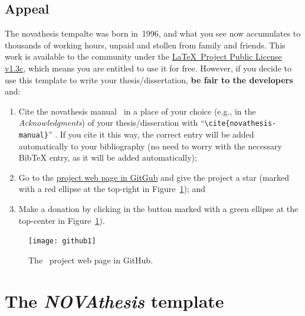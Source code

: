 \subsection{Appeal}
\label{sub:appeal}

The \gls{novathesis} tempalte was born in~1996, and what you see now accumulates to thousands of working hours, unpaid and stollen from family and friends.  This work is available to the community under the \href{LaTeX project public license}{\LaTeX\ Project Public License v1.3c}, which means you are entitled to use it for free.  However, if you decide to use this template to write your thesis/dissertation, \textbf{be fair to the developers} and:
\begin{enumerate}
  \item Cite the \gls{novathesis} manual~\cite{novathesis-manual} in a place of your choice (e.g., in the \emph{Acknowledgments}) of your thesis/disseration with “\verb!\cite{novathesis-manual}!” .  If you cite it this way, the correct entry will be added automatically to your bibliography (no need to worry with the necessary BibTeX entry, as it will be added automatically);
  \item Go to the
\href{https://github.com/joaomlourenco/novathesis}{project web page in GitGub} and give the project a star (marked with a red ellipse at the top-right in Figure~\ref{fig:github}); and
  \item Make a donation by clicking in the button marked with a green ellipse at the top-center in Figure~\ref{fig:github}).
\end{enumerate}

\begin{figure}[htbp]
  \centering
    \texttt{[image: github1]}
  \caption{The \novathesis\ project web page in GitHub.}
  \label{fig:github}
\end{figure}


\section{The \emph{NOVAthesis} template}
\label{sec:a_bit_of_history}

\newcommand{\mysmallcoversize}{0.09\linewidth}
\renewcommand{\theadfont}{\large\bfseries}
\newtoggle{ntRow}

\newcommand{\ntSchool}[4]{%
    \iftoggle{ntRow}{\rowcolor{GhostWhite}\global\togglefalse{ntRow}}{\global\toggletrue{ntRow}}
    \setlength{\fboxsep}{0pt}%
    \def\myspace{}%
    \makecell*[cc]{%
      \@for\listitem:=#1\do{%
        \myspace\fbox{\colorbox{White}{\texttt{[image: \\listitem]}}}\def\myspace{~}}%
    }
    & #2 \href{#4}{(#3)}\\%
}


